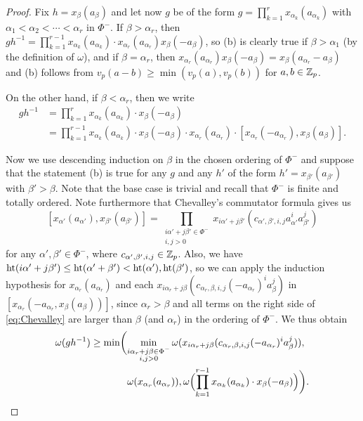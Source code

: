 \begin{proof}
Fix $h = x_{\beta}(a_{\beta})$ and let now $g$ be of the form $g = \prod_{k=1}^r x_{\alpha_k}(a_{\alpha_k})$ with $\alpha_1 < \alpha_2 < \dotsb < \alpha_r$ in $\Phi^{-}$. If $\beta > \alpha_{r}$, then $gh^{-1} = \prod_{k=1}^{r-1} x_{\alpha_k}(a_{\alpha_k}) \cdot x_{\alpha_{r}}(a_{\alpha_{r}}) x_{\beta}(-a_{\beta})$, so (b) is clearly true if $\beta > \alpha_1$ (by the definition of $\omega$), and if $\beta = \alpha_{r}$, then $x_{\alpha_{r}}(a_{\alpha_{r}})x_{\beta}(-a_{\beta}) = x_{\beta}(a_{\alpha_{r}} - a_{\beta})$ and (b) follows from $v_p(a-b) \geq \min(v_p(a),v_p(b))$ for $a,b \in \mathbb{Z}_p$.

On the other hand, if $\beta < \alpha_{r}$, then we write
\begin{align*}
  gh^{-1} &= \prod_{k=1}^{r} x_{\alpha_{k}}(a_{\alpha_{k}}) \cdot x_{\beta}(-a_{\beta}) \\
  &= \prod_{k=1}^{r-1} x_{\alpha_{k}}(a_{\alpha_{k}}) \cdot x_{\beta}(-a_{\beta}) \cdot x_{\alpha_{r}}(a_{\alpha_{r}}) \cdot [x_{\alpha_{r}}(-a_{\alpha_{r}}), x_{\beta}(a_{\beta})].
\end{align*}

Now we use descending induction on $\beta$ in the chosen ordering of $\Phi^{-}$ and suppose that the statement (b) is true for any $g$ and any $h'$ of the form $h' = x_{\beta'}(a_{\beta'})$ with $\beta' > \beta$. Note that the base case is trivial and recall that $\Phi^{-}$ is finite and totally ordered. Note furthermore that Chevalley's commutator formula gives us
\begin{equation}\label{eq:Chevalley}
  [x_{\alpha'}(a_{\alpha'}),x_{\beta'}(a_{\beta'})] = \prod_{\substack{i\alpha' + j\beta' \in \Phi^{-} \\ i,j>0}} x_{i\alpha'+ j\beta'}(c_{\alpha',\beta',i,j}a_{\alpha'}^{i}a_{\beta'}^{j})
\end{equation}
for any $\alpha',\beta' \in \Phi^{-}$, where $c_{\alpha',\beta',i,j} \in \mathbb{Z}_p$. Also, we have $\operatorname{ht}(i\alpha'+j\beta') \leq \operatorname{ht}(\alpha'+\beta') < \operatorname{ht}(\alpha'),\operatorname{ht}(\beta')$, so we can apply the induction hypothesis for $x_{\alpha_{r}}(a_{\alpha_{r}})$ and each $x_{i\alpha_{r}+j\beta}(c_{\alpha_{r},\beta,i,j}(-a_{\alpha_{r}})^{i}a_{\beta}^{j})$ in $[x_{\alpha_{r}}(-a_{\alpha_{r}},x_{\beta}(a_{\beta}))]$, since $\alpha_{r} > \beta$ and all terms on the right side of \eqref{eq:Chevalley} are larger than $\beta$ (and $\alpha_{r}$) in the ordering of $\Phi^{-}$. We thus obtain
\begin{equation}\label{eq:omega-par-ginvh}
  \begin{aligned}
    \omega(gh^{-1}) &\geq \min\biggl(\min_{\substack{i\alpha_{r}+j\beta \in \Phi^{-} \\ i,j>0}} \omega(x_{i\alpha_{r} + j\beta}(c_{\alpha_{r},\beta,i,j}(-a_{\alpha_{r}})^{i}a_{\beta}^{j})), \\*
    &\phantom{{} \geq \min\biggl( {}} \omega(x_{\alpha_{r}}(a_{\alpha_{r}})), \omega\Bigl( \prod_{k=1}^{r-1} x_{\alpha_k}(a_{\alpha_k}) \cdot x_{\beta}(-a_{\beta}) \Bigr) \biggr).
  \end{aligned}
\end{equation}


\end{proof}
